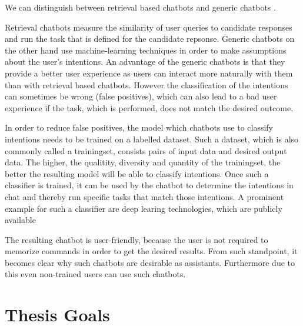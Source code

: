 We can distinguish between retrieval based chatbots and generic chatbots \cite{NLKl19}.

Retrieval chatbots measure the similarity of user queries to candidate responses and run the task that is defined for the candidate repsonse. Generic chatbots on the other hand use machine-learning techniques in order to make assumptions about the user's intentions. An advantage of the generic chatbots is that they provide a better user experience as users can interact more naturally with them than with retrieval based chatbots. However the classification of the intentions can sometimes be wrong (false positives), which can also lead to a bad user experience if the task, which is performed, does not match the desired outcome.

In order to reduce false positives, the model which chatbots use to classify intentions needs to be trained on a labelled dataset. Such a dataset, which is also commonly called a trainingset, consists pairs of input data and desired output data. The higher, the qualitity, diversity and quantity of the trainingset, the better the resulting model will be able to classify intentions.
Once such a classifier is trained, it can be used by the chatbot to determine the intentions in chat and thereby run specific tasks that match those intentions.
A prominent example for such a classifier are deep learing technologies, which are publicly available \cite{NLKl19}

The resulting chatbot is user-friendly, because the user is not required to memorize commands in order to get the desired results. From such standpoint, it becomes clear why such chatbots are desirable as assistants. Furthermore due to this even non-trained users can use such chatbots.
\newpage

\section{Thesis Goals}

\blankpage
